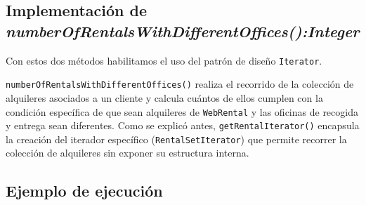 \newpage %

\subsection{Implementación de \textit{numberOfRentalsWithDifferentOffices():Integer}}

Con estos dos métodos habilitamos el uso del patrón de diseño \texttt{Iterator}.\par
\texttt{numberOfRentalsWithDifferentOffices()} realiza el recorrido de la colección de alquileres asociados a un cliente y 
calcula cuántos de ellos cumplen con la condición específica de que sean alquileres de \texttt{WebRental} y las oficinas 
de recogida y entrega sean diferentes. Como se explicó antes, \texttt{getRentalIterator()} encapsula la creación del iterador específico (\texttt{RentalSetIterator}) 
que permite recorrer la colección de alquileres sin exponer su estructura interna.

\newpage %

\subsection{Ejemplo de ejecución}



